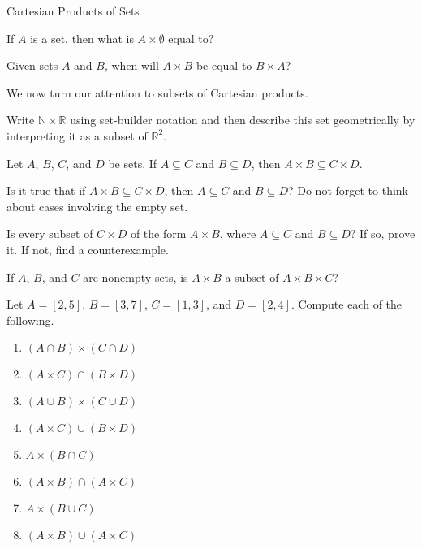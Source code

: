 \begin{section}{Cartesian Products of Sets}
\begin{problem}
If $A$ is a set, then what is $A\times \emptyset$ equal to?
\end{problem}

\begin{problem}
Given sets $A$ and $B$, when will $A\times B$ be equal to $B\times A$?
\end{problem}

We now turn our attention to subsets of Cartesian products.

\begin{problem}\label{prob:some lines}
Write $\mathbb{N}\times \mathbb{R}$ using set-builder notation and then describe this set geometrically by interpreting it as a subset of $\mathbb{R}^2$.
\end{problem}

\begin{theorem}
Let $A$, $B$, $C$, and $D$ be sets. If $A\subseteq C$ and $B\subseteq D$, then $A\times B\subseteq C\times D$.
\end{theorem}

\begin{problem}
Is it true that if $A\times B\subseteq C\times D$, then $A\subseteq C$ and $B\subseteq D$?  Do not forget to think about cases involving the empty set.
\end{problem}

\begin{problem}
Is every subset of $C\times D$ of the form $A\times B$, where $A\subseteq C$ and $B\subseteq D$?  If so, prove it.  If not, find a counterexample.
\end{problem}

\begin{problem}
If $A$, $B$, and $C$ are nonempty sets, is $A\times B$ a subset of $A\times B\times C$?
\end{problem}

\begin{problem}
Let $A=[2,5]$, $B=[3,7]$, $C=[1,3]$, and $D=[2,4]$.  Compute each of the following.
\begin{enumerate}[label=\textrm{(\alph*)}]
\item $(A\cap B)\times (C\cap D)$
\item $(A\times C)\cap (B\times D)$
\item $(A\cup B)\times (C\cup D)$
\item $(A\times C)\cup (B\times D)$
\item $A\times (B\cap C)$
\item $(A\times B)\cap (A\times C)$
\item $A\times (B\cup C)$
\item $(A\times B)\cup (A\times C)$
\end{enumerate}
\end{problem}


\end{section}
